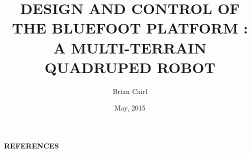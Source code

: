 





\renewcommand{\baselinestretch}{1.6}
\newtheorem{theorem}{Theorem}[chapter]
\newcommand{\btheorem}{\begin{theorem}\rm}
\newcommand{\etheorem}{$\diamond$\end{theorem}}
\newtheorem{definition}{Definition}[chapter]
\newcommand{\bdefn}{\begin{definition}\rm}
\newcommand{\edefn}{\end{definition}}
\newtheorem{lemma}{Lemma}[chapter]
\newtheorem{remark}{Remark}[chapter]
\newcommand{\bremark}{\begin{remark}\rm}
\newcommand{\eremark}{\end{remark}}
\newtheorem{example}{Example}[chapter]
\newcommand{\bexample}{\begin{example}\rm}
\newcommand{\eexample}{\end{example}}
\newtheorem{assumption}{Assumption}[chapter]
\newcommand{\bassump}{\begin{assumption}\rm}
\newcommand{\eassump}{\end{assumption}}

\title{DESIGN AND CONTROL OF THE BLUEFOOT PLATFORM :\\A MULTI-TERRAIN QUADRUPED ROBOT}
\author{Brian Cairl}
\date{May, 2015}

\mstitlepage
\topmargin=0.4in
\textwidth=6.0in
\textheight=9.0in





\setcounter{page}{1}






\normalsize
\tableofcontents
\listoffigures
\listoftables
\newpage
\setcounter{page}{1}
	
	
	
	
	
	
	
	\begin{appendices}
		
		
		
	\end{appendices}
{\newpage
	{\begin{center}{\textbf{REFERENCES}}\end{center}}


}


